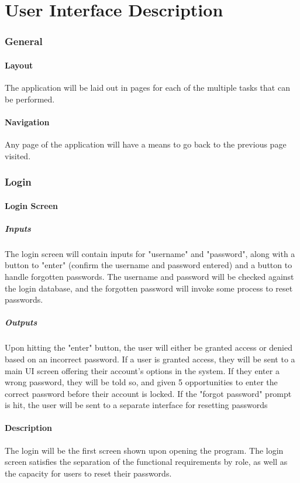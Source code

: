 \documentclass{article}
\begin{document}
\part{User Interface Description}

\section{General}
\subsection{Layout}
The application will be laid out in pages for each of the multiple tasks that
can be performed.
\subsection{Navigation}
Any page of the application will have a means to go back to the previous
page visited.

\section{Login}
\subsection{Login Screen}
\subsubsection{Inputs}
The login screen will contain inputs for "username" and "password", along with a
button to "enter" (confirm the username and password entered) and a button to handle
forgotten passwords. The username and password will be checked against the login database,
and the forgotten password will invoke some process to reset passwords.
\subsubsection{Outputs}
Upon hitting the "enter" button, the user will either be granted access or denied based
on an incorrect password. If a user is granted access, they will be sent
to a main UI screen offering their account's options in the system. If they enter a wrong
password, they will be told so, and given 5 opportunities to enter the correct password
before their account is locked. If the "forgot password" prompt is hit, the user will be sent
to a separate interface for resetting passwords
\subsection{Description}
The login will be the first screen shown upon opening the program. The login screen 
satisfies the separation of the functional requirements by role, as well as the capacity for users
to reset their passwords.
\end{document}
